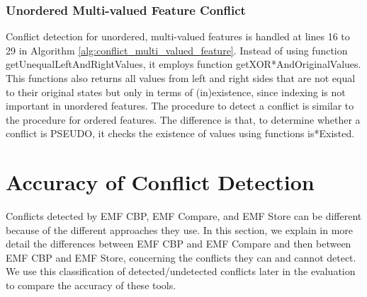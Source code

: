 \subsubsection{Unordered Multi-valued Feature Conflict}
\label{sec:unordered_conflict}
Conflict detection for unordered, multi-valued features is handled at lines 16 to 29 in Algorithm \ref{alg:conflict_multi_valued_feature}. Instead of using function \textsf{getUnequalLeftAndRightValues}, it employs function \textsf{getXOR*AndOriginalValues}. This functions also returns all values from left and right sides that are not equal to their original states but only in terms of (in)existence, since indexing is not important in unordered features. The procedure to detect a conflict is similar to the procedure for ordered features. The difference is that, to determine whether a conflict is \textsf{PSEUDO}, it checks the existence of values using functions \textsf{is*Existed}.

\section{Accuracy of Conflict Detection}
\label{sec:accuracy_of_conflict_detection}
Conflicts detected by EMF CBP, EMF Compare, and EMF Store can be different because of the different approaches they use. In this section, we explain in more detail the differences between EMF CBP and EMF Compare and then between EMF CBP and EMF Store, concerning the conflicts they can and cannot detect. We use this classification of detected/undetected conflicts later in the evaluation to compare the accuracy of these tools.

